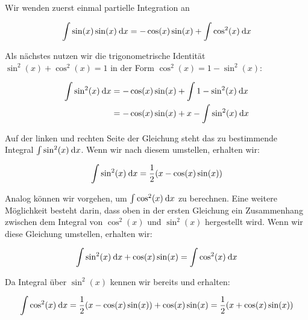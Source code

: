\item Wir wenden zuerst einmal partielle Integration an

$$
	\int \sin(x) \sin(x) \:\mathrm{d}{x} = -\cos(x)\sin(x) + \int \cos^2(x) \:\mathrm{d}{x}
$$

Als nächstes nutzen wir die trigonometrische Identität $\sin^2(x)+\cos^2(x)=1$ in der Form $\cos^2(x) = 1-\sin^2(x)$:

\begin{alignat*}{1}
	\int \sin^2(x) \:\mathrm{d}{x} &= -\cos(x)\sin(x) + \int 1-\sin^2(x) \:\mathrm{d}{x} \\
	                        &= -\cos(x)\sin(x) + x - \int \sin^2(x) \:\mathrm{d}{x}
\end{alignat*}

Auf der linken und rechten Seite der Gleichung steht das zu bestimmende Integral $\int \sin^2(x)\:\mathrm{d}{x}$. Wenn wir nach diesem umstellen, erhalten wir:

\begin{alignat*}{1}
	\int \sin^2(x) \:\mathrm{d}{x} = \frac{1}{2} (x-\cos(x)\sin(x))
\end{alignat*}

Analog können wir vorgehen, um $\int \cos^2(x) \:\mathrm{d}{x}$ zu berechnen. Eine weitere Möglichkeit besteht darin, dass oben in der ersten Gleichung ein Zusammenhang zwischen dem Integral von $\cos^2(x)$ und $\sin^2(x)$ hergestellt wird. Wenn wir diese Gleichung umstellen, erhalten wir:

$$
	\int \sin^2(x) \:\mathrm{d}{x} + \cos(x)\sin(x) = \int \cos^2(x) \:\mathrm{d}{x}
$$

Da Integral über $\sin^2(x)$ kennen wir bereits und erhalten:

$$
	\int \cos^2(x) \:\mathrm{d}{x} =  \frac{1}{2} (x-\cos(x)\sin(x)) + \cos(x)\sin(x) = \frac{1}{2} (x+\cos(x)\sin(x))
$$
